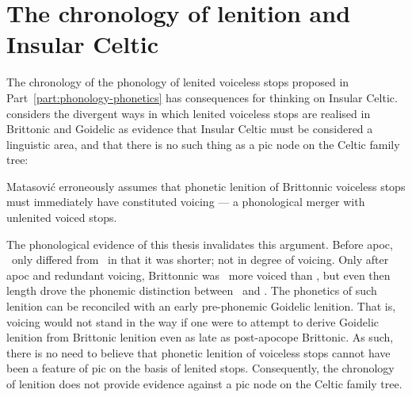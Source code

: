 \section{The chronology of lenition and Insular Celtic}
\label{sec:cons-other-rese-1}
The chronology of the phonology of lenited voiceless stops proposed in Part~\ref{part:phonology-phonetics} has consequences for thinking on Insular Celtic. \Textcite{matasovic_insular_2008} considers the divergent ways in which lenited voiceless stops are realised in Brittonic and Goidelic as evidence that Insular Celtic must be considered  a linguistic area, and that there is no such thing as a \gls{pic} node on the Celtic family tree:

Matasović erroneously assumes that phonetic lenition of Brittonnic  voiceless stops must immediately have constituted voicing --- a phonological merger with unlenited voiced stops.

The phonological evidence of this thesis invalidates this argument. Before \gls{apoc}, \lT\ only differed from \xT\ in that it was shorter; not in degree of voicing. Only after \gls{apoc} and redundant voicing, Brittonnic was \lT\  more voiced than \xT, but even then length drove the phonemic distinction between \xT\ and \lT. The phonetics of such lenition can be reconciled with an early pre-phonemic Goidelic lenition. That is, voicing would not stand in the way if one were to attempt to derive Goidelic lenition from Brittonic lenition even as late as post-apocope Brittonic. As such, there is no need to believe  that phonetic lenition of voiceless stops cannot have been a feature of \gls{pic} on the basis of lenited stops. Consequently, the chronology of lenition does not provide evidence against a \gls{pic} node on the Celtic family tree.

